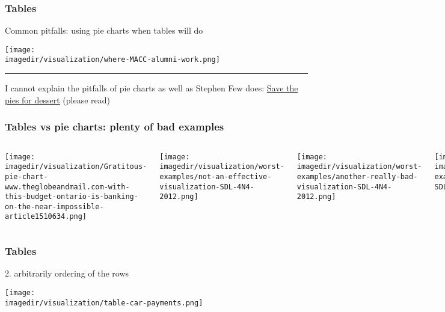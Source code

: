 \begin{frame}\frametitle{Tables}
	Common pitfalls: using pie charts when tables will do 
	\begin{center}
		\texttt{[image: \\imagedir/visualization/where-MACC-alumni-work.png]}
	\end{center}
	\hrule
	\vspace{4pt}
	I cannot explain the pitfalls of pie charts as well as Stephen Few does: \href{http://www.perceptualedge.com/articles/08-21-07.pdf}{Save the pies for dessert} (please read)
\end{frame}

\begin{frame}\frametitle{Tables vs pie charts: plenty of bad examples}
	\begin{columns}[t]
			\begin{center}
				\texttt{[image: \\imagedir/visualization/Gratitous-pie-chart-www.theglobeandmail.com-with-this-budget-ontario-is-banking-on-the-near-impossible-article1510634.png]}
			\end{center}
			\begin{center}
				\texttt{[image: \\imagedir/visualization/worst-examples/not-an-effective-visualization-SDL-4N4-2012.png]}
			\end{center}
			\begin{center}
				\texttt{[image: \\imagedir/visualization/worst-examples/another-really-bad-visualization-SDL-4N4-2012.png]}
			\end{center}
			\begin{center}
				\texttt{[image: \\imagedir/visualization/worst-examples/idiotic-pie-chart-SDL-4N4-2012.png]}
			\end{center}
	\end{columns}
	\vspace{12pt}
\end{frame}

\begin{frame}\frametitle{Tables}
	2. arbitrarily ordering of the rows 
	\begin{center}
		\texttt{[image: \\imagedir/visualization/table-car-payments.png]}
	\end{center}
\end{frame}

